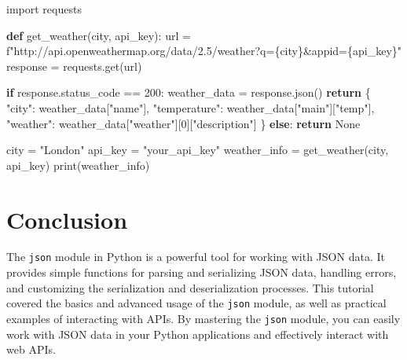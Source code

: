 \documentclass[
  letterpaper,
  DIV=11,
  numbers=noendperiod]{scrreprt}
\newenvironment{Shaded}{\begin{snugshade}}{\end{snugshade}}
\newcommand{\BuiltInTok}[1]{\textcolor[rgb]{0.00,0.23,0.31}{#1}}
\newcommand{\ControlFlowTok}[1]{\textcolor[rgb]{0.00,0.23,0.31}{\textbf{#1}}}
\newcommand{\DecValTok}[1]{\textcolor[rgb]{0.68,0.00,0.00}{#1}}
\newcommand{\ImportTok}[1]{\textcolor[rgb]{0.00,0.46,0.62}{#1}}
\newcommand{\KeywordTok}[1]{\textcolor[rgb]{0.00,0.23,0.31}{\textbf{#1}}}
\newcommand{\NormalTok}[1]{\textcolor[rgb]{0.00,0.23,0.31}{#1}}
\newcommand{\OperatorTok}[1]{\textcolor[rgb]{0.37,0.37,0.37}{#1}}
\newcommand{\SpecialCharTok}[1]{\textcolor[rgb]{0.37,0.37,0.37}{#1}}
\newcommand{\SpecialStringTok}[1]{\textcolor[rgb]{0.13,0.47,0.30}{#1}}
\newcommand{\StringTok}[1]{\textcolor[rgb]{0.13,0.47,0.30}{#1}}
\newcommand{\VariableTok}[1]{\textcolor[rgb]{0.07,0.07,0.07}{#1}}
\begin{document}
\begin{Shaded}
\begin{Highlighting}[]
\ImportTok{import}\NormalTok{ requests}

\KeywordTok{def}\NormalTok{ get\_weather(city, api\_key):}
\NormalTok{    url }\OperatorTok{=} \SpecialStringTok{f"http://api.openweathermap.org/data/2.5/weather?q=}\SpecialCharTok{\{}\NormalTok{city}\SpecialCharTok{\}}\SpecialStringTok{\&appid=}\SpecialCharTok{\{}\NormalTok{api\_key}\SpecialCharTok{\}}\SpecialStringTok{"}
\NormalTok{    response }\OperatorTok{=}\NormalTok{ requests.get(url)}
    
    \ControlFlowTok{if}\NormalTok{ response.status\_code }\OperatorTok{==} \DecValTok{200}\NormalTok{:}
\NormalTok{        weather\_data }\OperatorTok{=}\NormalTok{ response.json()}
        \ControlFlowTok{return}\NormalTok{ \{}
            \StringTok{"city"}\NormalTok{: weather\_data[}\StringTok{"name"}\NormalTok{],}
            \StringTok{"temperature"}\NormalTok{: weather\_data[}\StringTok{"main"}\NormalTok{][}\StringTok{"temp"}\NormalTok{],}
            \StringTok{"weather"}\NormalTok{: weather\_data[}\StringTok{"weather"}\NormalTok{][}\DecValTok{0}\NormalTok{][}\StringTok{"description"}\NormalTok{]}
\NormalTok{        \}}
    \ControlFlowTok{else}\NormalTok{:}
        \ControlFlowTok{return} \VariableTok{None}

\NormalTok{city }\OperatorTok{=} \StringTok{"London"}
\NormalTok{api\_key }\OperatorTok{=} \StringTok{"your\_api\_key"}
\NormalTok{weather\_info }\OperatorTok{=}\NormalTok{ get\_weather(city, api\_key)}
\BuiltInTok{print}\NormalTok{(weather\_info)}
\end{Highlighting}
\end{Shaded}

\section{Conclusion}\label{conclusion-19}

The \texttt{json} module in Python is a powerful tool for working with
JSON data. It provides simple functions for parsing and serializing JSON
data, handling errors, and customizing the serialization and
deserialization processes. This tutorial covered the basics and advanced
usage of the \texttt{json} module, as well as practical examples of
interacting with APIs. By mastering the \texttt{json} module, you can
easily work with JSON data in your Python applications and effectively
interact with web APIs.
\end{document}
